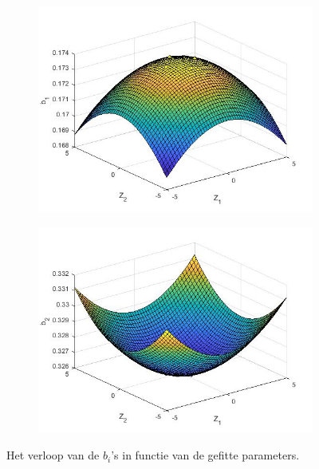 \documentclass[12pt]{article}
\begin{document}
\begin{figure}[H]
    \centering
    \begin{subfigure}{0.49\textwidth}
        \includegraphics[width=\textwidth]{b1_s4.jpg}
    \end{subfigure}
    \begin{subfigure}{0.49\textwidth}
        \includegraphics[width=\textwidth]{b2_s4.jpg}
    \end{subfigure}
    \caption{Het verloop van de \(b_i\)'s in functie van de gefitte parameters.}
    \label{fig:coefgraphss4}
\end{figure}
\end{document}
